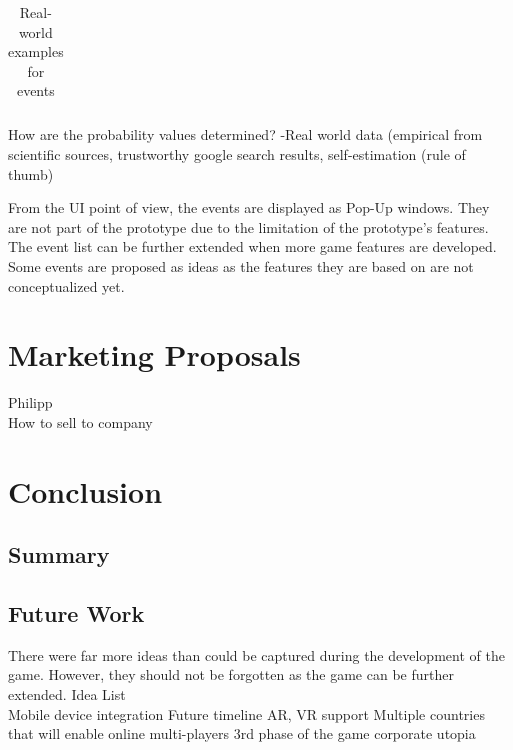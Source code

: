\documentclass[11pt,titlepage,oneside,openany]{book}
\begin{document}
\begin{table}[]
\begin{tabular}{|l|l|l|}
\end{tabular}
\caption{Real-world examples for events}
    \label{Examples_events}
\end{table}

How are the probability values determined? -Real world data (empirical from scientific sources, trustworthy google search results, self-estimation (rule of thumb) 

From the UI point of view, the events are displayed as Pop-Up windows. They are not part of the prototype due to the limitation of the prototype's features. The event list can be further extended when more game features are developed. Some events are proposed as ideas as the features they are based on are not conceptualized yet.




\chapter{Marketing Proposals}
Philipp\\
\label{cha:exp}
\label{sec:setting}
How to sell to company


\chapter{Conclusion}
\label{cha:conclusion}


\section{Summary}
\label{sec:sum}

\section{Future Work}
\label{sec:future}
There were far more ideas than could be captured during the development of the game. However, they should not be forgotten as the game can be further extended. 
Idea List\\
Mobile device integration
Future timeline
AR, VR support
Multiple countries that will enable online multi-players
3rd phase of the game corporate utopia




\appendix
\end{document}
